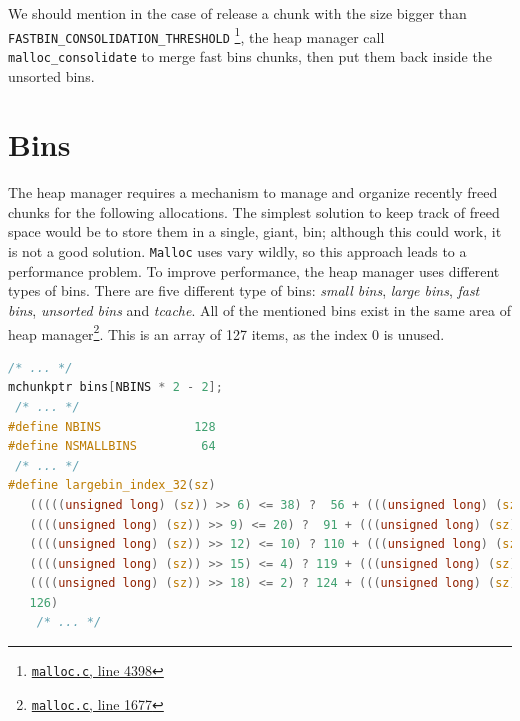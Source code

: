 \documentclass{masterthesis}
\newcommand*\tch{tcache}
\newcommand*\fb{fast bins}
\newcommand*\ub{unsorted bins}
\newcommand*\lb{large bins}
\newcommand*\sbs{small bins}
\newcommand*\Mallocc{\lstinline{Malloc}\xspace}
\begin{document}
We should mention in the case of release a chunk with the size bigger than \linebreak \lstinline{FASTBIN_CONSOLIDATION_THRESHOLD} \footnote{\href{https://sourceware.org/git/?p=glibc.git;a=blob;f=malloc/malloc.c;h=f7cd29bc2f93e1082ee77800bd64a4b2a2897055;hb=9ea3686266dca3f004ba874745a4087a89682617\#l4398}{\texttt{malloc.c}, line 4398}}, the heap manager call \lstinline{malloc_consolidate} to merge \fb{} chunks, then put them back inside the \ub{}.

\section{Bins}
\label{sect:bins}
The heap manager requires a mechanism to manage and organize recently freed chunks for the following allocations. The simplest solution to keep track of freed space would be to store them in a single, giant, bin; although this could work, it is not a good solution. \Mallocc{} uses vary wildly, so this approach leads to a performance problem.
To improve performance, the heap manager uses different types of bins. There are five different type of bins: \emph{\sbs{}}, \emph{\lb{}}, \emph{\fb{}}, \emph{\ub{}} and \emph{\tch{}}. All of the mentioned bins exist in the same area of heap manager\footnote{\href{https://sourceware.org/git/?p=glibc.git;a=blob;f=malloc/malloc.c;h=f7cd29bc2f93e1082ee77800bd64a4b2a2897055;hb=9ea3686266dca3f004ba874745a4087a89682617\#l1677}{\texttt{malloc.c}, line 1677}}. This is an array of 127 items, as the index 0 is unused.
\begin{lstlisting}[language=c,frame=tlrb]
 /* ... */
mchunkptr bins[NBINS * 2 - 2];
 /* ... */
#define NBINS             128
#define NSMALLBINS         64
 /* ... */
#define largebin_index_32(sz)                                                \
   (((((unsigned long) (sz)) >> 6) <= 38) ?  56 + (((unsigned long) (sz)) >> 6) :\
   ((((unsigned long) (sz)) >> 9) <= 20) ?  91 + (((unsigned long) (sz)) >> 9) :\
   ((((unsigned long) (sz)) >> 12) <= 10) ? 110 + (((unsigned long) (sz)) >> 12) :\
   ((((unsigned long) (sz)) >> 15) <= 4) ? 119 + (((unsigned long) (sz)) >> 15) :\
   ((((unsigned long) (sz)) >> 18) <= 2) ? 124 + (((unsigned long) (sz)) >> 18) :\
   126)
    /* ... */
\end{lstlisting}
\end{document}
